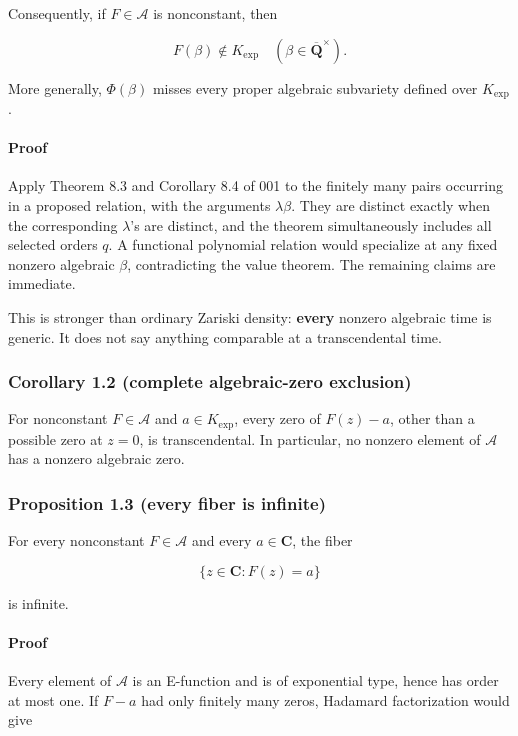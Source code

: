 Consequently, if \(F\in\mathscr A\) is nonconstant, then

\[
  F(\beta)\notin K_{\exp}
  \quad(\beta\in\overline{\mathbf Q}^{\times}).                 \tag{J-1.1}
\]

More generally, \(\Phi(\beta)\) misses every proper algebraic subvariety
defined over \(K_{\exp}\).

\paragraph{Proof}

Apply Theorem 8.3 and Corollary 8.4 of 001 to the finitely many pairs
occurring in a proposed relation, with the arguments \(\lambda\beta\).
They are distinct exactly when the corresponding \(\lambda\)'s are distinct,
and the theorem simultaneously includes all selected orders \(q\). A
functional polynomial relation would specialize at any fixed nonzero
algebraic \(\beta\), contradicting the value theorem. The remaining claims
are immediate.

This is stronger than ordinary Zariski density: \textbf{every} nonzero algebraic
time is generic. It does not say anything comparable at a transcendental
time.

\subsubsection{Corollary 1.2 (complete algebraic-zero exclusion)}

For nonconstant \(F\in\mathscr A\) and \(a\in K_{\exp}\), every zero of
\(F(z)-a\), other than a possible zero at \(z=0\), is transcendental.
In particular, no nonzero element of \(\mathscr A\) has a nonzero algebraic
zero.

\subsubsection{Proposition 1.3 (every fiber is infinite)}

For every nonconstant \(F\in\mathscr A\) and every \(a\in\mathbf C\), the
fiber

\[
  \{z\in\mathbf C:F(z)=a\}
\]

is infinite.

\paragraph{Proof}

Every element of \(\mathscr A\) is an E-function and is of exponential type,
hence has order at most one. If \(F-a\) had only finitely many zeros,
Hadamard factorization would give

